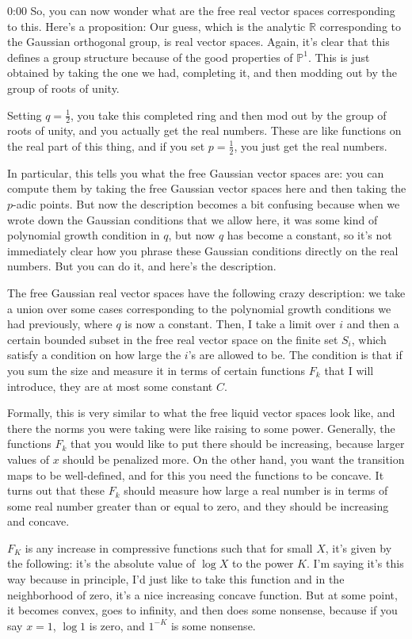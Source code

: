 \begin{unfinished}{0:00}
So, you can now wonder what are the free real vector spaces corresponding to this. Here's a proposition: Our guess, which is the analytic $\mathbb{R}$ corresponding to the Gaussian orthogonal group, is real vector spaces. Again, it's clear that this defines a group structure because of the good properties of $\mathbb{P}^1$. This is just obtained by taking the one we had, completing it, and then modding out by the group of roots of unity.

Setting $q = \frac{1}{2}$, you take this completed ring and then mod out by the group of roots of unity, and you actually get the real numbers. These are like functions on the real part of this thing, and if you set $p = \frac{1}{2}$, you just get the real numbers.

In particular, this tells you what the free Gaussian vector spaces are: you can compute them by taking the free Gaussian vector spaces here and then taking the
$p$-adic points. But now the description becomes a bit confusing because when we wrote down the Gaussian conditions that we allow here, it was some kind of polynomial growth condition in $q$, but now $q$ has become a constant, so it's not immediately clear how you phrase these Gaussian conditions directly on the real numbers. But you can do it, and here's the description.

The free Gaussian real vector spaces have the following crazy description: we take a union over some cases corresponding to the polynomial growth conditions we had previously, where $q$ is now a constant. Then, I take a limit over $i$ and then a certain bounded subset in the free real vector space on the finite set $S_i$, which satisfy a condition on how large the $i$'s are allowed to be. The condition is that if you sum the size and measure it in terms of certain functions $F_k$ that I will introduce, they are at most some constant $C$.

Formally, this is very similar to what the free liquid vector spaces look like, and there the norms you were taking were like raising to some power. Generally, the functions $F_k$ that you would like to put there should be increasing, because larger values of $x$ should be penalized more. On the other hand, you want the transition maps to be well-defined, and for this you need the functions to be concave. It turns out that these $F_k$ should measure how large a real number is in terms of some real number greater than or equal to zero, and they should be increasing and concave.


$F_K$ is any increase in compressive functions such that for small $X$, it's given by the following: it's the absolute value of $\log X$ to the power $K$. I'm saying it's this way because in principle, I'd just like to take this function and in the neighborhood of zero, it's a nice increasing concave function. But at some point, it becomes convex, goes to infinity, and then does some nonsense, because if you say $x = 1$, $\log 1$ is zero, and $1^{-K}$ is some nonsense. 


\end{unfinished}

